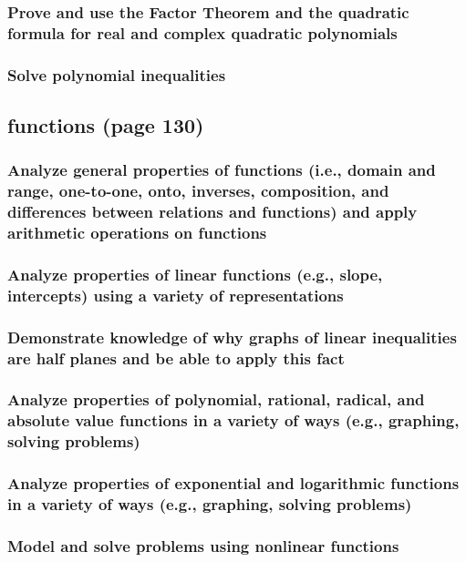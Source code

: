 \documentclass[11pt]{article}
\begin{document}
\subsubsection{Prove and use the Factor Theorem and the quadratic formula for real and complex quadratic polynomials}
\label{sec:org5552ef2}
\subsubsection{Solve polynomial inequalities}
\label{sec:org63c8ecc}
\subsection{functions (page 130)}
\label{sec:org3198199}
\subsubsection{Analyze general properties of functions (i.e., domain and range, one-to-one, onto, inverses, composition, and differences between relations and functions) and apply arithmetic operations on functions}
\label{sec:org9c44b93}
\subsubsection{Analyze properties of linear functions (e.g., slope, intercepts) using a variety of representations}
\label{sec:orgfe582b4}
\subsubsection{Demonstrate knowledge of why graphs of linear inequalities are half planes and be able to apply this fact}
\label{sec:org6d45021}
\subsubsection{Analyze properties of polynomial, rational, radical, and absolute value functions in a variety of ways (e.g., graphing, solving problems)}
\label{sec:org64bec62}
\subsubsection{Analyze properties of exponential and logarithmic functions in a variety of ways (e.g., graphing, solving problems)}
\label{sec:org9bb0a40}
\subsubsection{Model and solve problems using nonlinear functions}
\label{sec:org57e4325}
\end{document}
